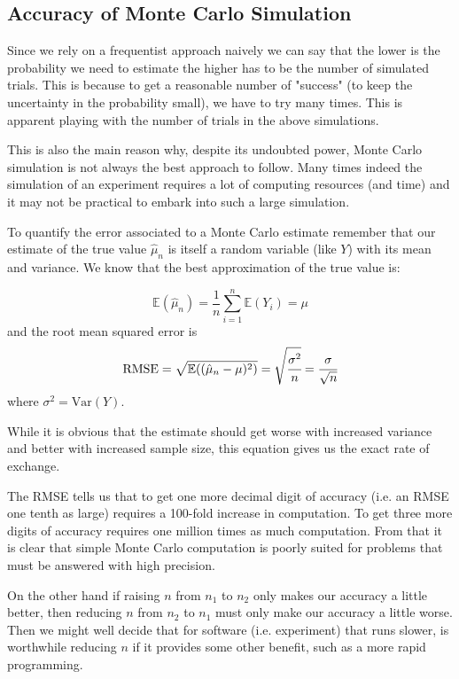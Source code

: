 \subsection{Accuracy of Monte Carlo Simulation}

Since we rely on a frequentist approach naively we can say that the lower is the probability we need to estimate the higher has to be the number of simulated trials. This is because to get a reasonable number of "success" (to keep the uncertainty in the probability small), we have to try many times. This is apparent playing with the number of trials in the above simulations. 

This is also the main reason why, despite its undoubted power, Monte Carlo simulation is not always the best approach to follow.
Many times indeed the simulation of an experiment requires a lot of computing resources (and time) and it may not be practical to embark into such a large simulation.

To quantify the error associated to a Monte Carlo estimate remember that our estimate of the true value $\hat{\mu}_n$ is itself a random variable (like $Y$) with its mean and variance. We know that the best approximation of the true value is:

\[\mathbb{E}(\hat{\mu}_n) = \frac{1}{n}\sum_{i=1}^{n}\mathbb{E}(Y_i)=\mu \]
and the root mean squared error is 
\[\mathrm{RMSE} = \sqrt{\mathbb{E}((\hat{\mu}_n - \mu)^2)}=\sqrt{\cfrac{\sigma^2}{n}} = \cfrac{\sigma}{\sqrt{n}}\]
where $\sigma^2 = \mathrm{Var}(Y)$.

While it is obvious that the estimate should get worse with increased variance and better with increased sample size, this equation  gives us the exact rate of exchange. 

The RMSE tells us that to get one more decimal digit of accuracy (i.e. an RMSE one tenth as large) requires a 100-fold increase in computation. To get three more digits of accuracy requires one million times as much computation. From that it is clear that simple Monte Carlo computation is poorly suited for problems that must be answered with high precision.

On the other hand if raising $n$ from $n_1$ to $n_2$ only makes our accuracy a little better, then reducing $n$ from $n_2$ to $n_1$ must only make our accuracy a little worse. Then we might well decide that for software (i.e. experiment) that runs slower, is worthwhile reducing $n$ if it provides some other benefit, such as a more rapid programming.

